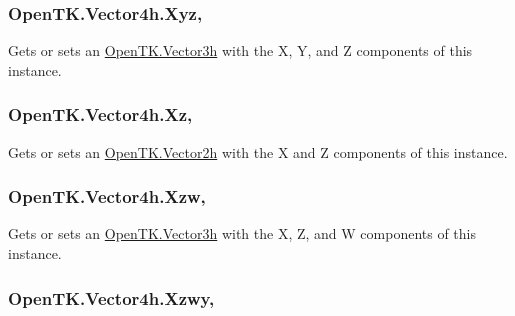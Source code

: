 \hypertarget{struct_open_t_k_1_1_vector4h_a5a6bb3771030dbf1d53ed8e4b31653c8}{
\subsubsection[{Xyz}]{ Open\-T\-K.\-Vector4h.\-Xyz\hspace{0.3cm}{\ttfamily [get]}, {\ttfamily [set]}}}\label{struct_open_t_k_1_1_vector4h_a5a6bb3771030dbf1d53ed8e4b31653c8}


Gets or sets an \hyperlink{struct_open_t_k_1_1_vector3h}{Open\-T\-K.\-Vector3h} with the X, Y, and Z components of this instance. 

\hypertarget{struct_open_t_k_1_1_vector4h_abc0270e51e46476bc96dfe59aecdd8fd}{
\subsubsection[{Xz}]{ Open\-T\-K.\-Vector4h.\-Xz\hspace{0.3cm}{\ttfamily [get]}, {\ttfamily [set]}}}\label{struct_open_t_k_1_1_vector4h_abc0270e51e46476bc96dfe59aecdd8fd}


Gets or sets an \hyperlink{struct_open_t_k_1_1_vector2h}{Open\-T\-K.\-Vector2h} with the X and Z components of this instance. 

\hypertarget{struct_open_t_k_1_1_vector4h_afaf3da5127bcdff5596c17ad34c3f8c9}{
\subsubsection[{Xzw}]{ Open\-T\-K.\-Vector4h.\-Xzw\hspace{0.3cm}{\ttfamily [get]}, {\ttfamily [set]}}}\label{struct_open_t_k_1_1_vector4h_afaf3da5127bcdff5596c17ad34c3f8c9}


Gets or sets an \hyperlink{struct_open_t_k_1_1_vector3h}{Open\-T\-K.\-Vector3h} with the X, Z, and W components of this instance. 

\hypertarget{struct_open_t_k_1_1_vector4h_aee741f57d4b2084b48a3e7cf112d8e48}{
\subsubsection[{Xzwy}]{ Open\-T\-K.\-Vector4h.\-Xzwy\hspace{0.3cm}{\ttfamily [get]}, {\ttfamily [set]}}}\label{struct_open_t_k_1_1_vector4h_aee741f57d4b2084b48a3e7cf112d8e48}


